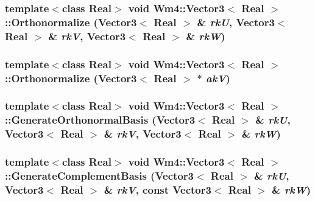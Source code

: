 \subsubsection{\setlength{\rightskip}{0pt plus 5cm}template$<$class Real$>$ void {\bf Wm4::Vector3}$<$ Real $>$::Orthonormalize ({\bf Vector3}$<$ Real $>$ \& {\em rk\-U}, {\bf Vector3}$<$ Real $>$ \& {\em rk\-V}, {\bf Vector3}$<$ Real $>$ \& {\em rk\-W})\hspace{0.3cm}{\tt  [static]}}\label{classWm4_1_1Vector3_0683c0eb8409e5aae3d97e6eef388b40}


\subsubsection{\setlength{\rightskip}{0pt plus 5cm}template$<$class Real$>$ void {\bf Wm4::Vector3}$<$ Real $>$::Orthonormalize ({\bf Vector3}$<$ Real $>$ $\ast$ {\em ak\-V})\hspace{0.3cm}{\tt  [static]}}\label{classWm4_1_1Vector3_aa8d8a7ed438b61bf2bda96cf692b809}


\subsubsection{\setlength{\rightskip}{0pt plus 5cm}template$<$class Real$>$ void {\bf Wm4::Vector3}$<$ Real $>$::Generate\-Orthonormal\-Basis ({\bf Vector3}$<$ Real $>$ \& {\em rk\-U}, {\bf Vector3}$<$ Real $>$ \& {\em rk\-V}, {\bf Vector3}$<$ Real $>$ \& {\em rk\-W})\hspace{0.3cm}{\tt  [static]}}\label{classWm4_1_1Vector3_c02acfd8ea2501022b8408085db2f78a}


\subsubsection{\setlength{\rightskip}{0pt plus 5cm}template$<$class Real$>$ void {\bf Wm4::Vector3}$<$ Real $>$::Generate\-Complement\-Basis ({\bf Vector3}$<$ Real $>$ \& {\em rk\-U}, {\bf Vector3}$<$ Real $>$ \& {\em rk\-V}, const {\bf Vector3}$<$ Real $>$ \& {\em rk\-W})\hspace{0.3cm}{\tt  [static]}}\label{classWm4_1_1Vector3_c9d9839d0871bfe560834eec756125b5}


